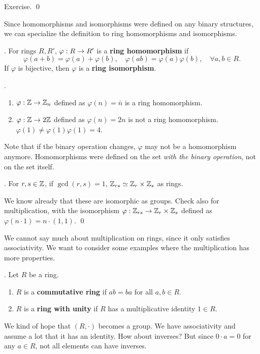 \pf Exercise. \qed

Since homomorphisms and isomorphisms were defined on any binary structures, we can specialize the definition to ring homomorphisms and isomorphisms.

. For rings \(R, R'\), \(\varphi: R \rightarrow R'\) is a \textbf{ring homomorphism} if
\[
    \varphi(a + b) = \varphi(a) + \varphi(b), \quad \varphi(ab) = \varphi(a)\varphi(b), \quad \forall a, b \in R.
\]
If \(\varphi\) is bijective, then \(\varphi\) is a \textbf{ring isomorphism}.

\ex.
\begin{enumerate}
    \item \(\varphi: \mathbb{Z} \rightarrow \mathbb{Z}_n\) defined as \(\varphi(n) = \bar{n}\) is a ring homomorphism.
    \item \(\varphi: \mathbb{Z} \rightarrow 2\mathbb{Z}\) defined as \(\varphi(n) = 2n\) is not a ring homomorphism. \(\varphi(1) \neq \varphi(1) \varphi(1) = 4\).
\end{enumerate}

\rmk Note that if the binary operation changes, \(\varphi\) may not be a homomorphism anymore. Homomorphisms were defined on the set \textit{with the binary operation}, not on the set itself.

\prop. For \(r, s \in \mathbb{Z}\), if \(\gcd(r, s) = 1\), \(\mathbb{Z}_{rs} \simeq \mathbb{Z}_r \times \mathbb{Z}_s\) as rings.

\pf We know already that these are isomorphic as groups. Check also for multiplication, with the isomorphism \(\varphi: \mathbb{Z}_{rs} \rightarrow \mathbb{Z}_r \times \mathbb{Z}_s\) defined as \(\varphi(n \cdot 1) = n \cdot (1, 1)\). \qed

\pagebreak

We cannot say much about multiplication on rings, since it only satisfies associativity. We want to consider some examples where the multiplication has more properties.

. Let \(R\) be a ring.
\begin{enumerate}
    \item {} \(R\) is a \textbf{commutative ring} if \(ab = ba\) for all \(a, b \in R\).
    \item {} \(R\) is a \textbf{ring with unity} if \(R\) has a multiplicative identity \(1\in R\).
\end{enumerate}

We kind of hope that \((R, \cdot)\) becomes a group. We have associativity and assume a lot that it has an identity. How about inverses? But since \(0 \cdot a = 0\) for any \(a \in R\), not all elements can have inverses.


